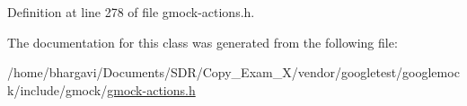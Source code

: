 Definition at line 278 of file gmock-\/actions.\+h.



The documentation for this class was generated from the following file\+:\begin{DoxyCompactItemize}
\item 
/home/bhargavi/\+Documents/\+S\+D\+R/\+Copy\+\_\+\+Exam\+\_\+X/vendor/googletest/googlemock/include/gmock/\hyperlink{gmock-actions_8h}{gmock-\/actions.\+h}\end{DoxyCompactItemize}
